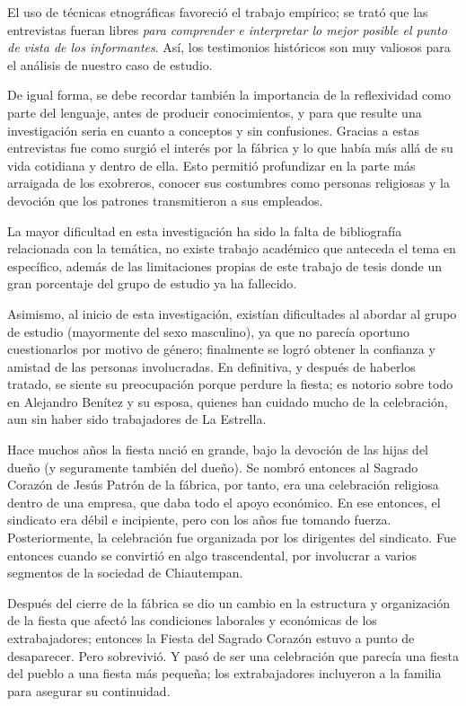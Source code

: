 \documentclass[14pt,letterpaper,twoside]{extbook} %
\begin{document}
El uso de técnicas etnográficas favoreció el trabajo empírico; se trató que las entrevistas fueran libres \textit{para comprender e interpretar lo mejor posible el punto de vista de los informantes}. Así, los testimonios históricos son muy valiosos para el análisis de nuestro caso de estudio.

De igual forma, se debe recordar también la importancia de la reflexividad como parte del lenguaje, antes de producir conocimientos, y para que resulte una investigación seria en cuanto a conceptos y sin confusiones. Gracias a estas entrevistas fue como surgió el interés por la fábrica y lo que había más allá de su vida cotidiana y dentro de ella. Esto permitió profundizar en la parte más arraigada de los exobreros, conocer sus costumbres como personas religiosas y la devoción que los patrones transmitieron a sus empleados.

La mayor dificultad en esta investigación ha sido la falta de bibliografía relacionada con la temática, no existe trabajo académico que anteceda el tema en específico, además de las limitaciones propias de este trabajo de tesis donde un gran porcentaje del grupo de estudio ya ha fallecido.

Asimismo, al inicio de esta investigación, existían dificultades al abordar al grupo de estudio (mayormente del sexo masculino), ya que no parecía oportuno cuestionarlos por motivo de género; finalmente se logró obtener la confianza y amistad de las personas involucradas. En definitiva, y después de haberlos tratado, se siente su preocupación porque perdure la fiesta; es notorio sobre todo en Alejandro Benítez y su esposa, quienes han cuidado mucho de la celebración, aun sin haber sido trabajadores de La Estrella.

Hace muchos años la fiesta nació en grande, bajo la devoción de las hijas del dueño (y seguramente también del dueño). Se nombró entonces al Sagrado Corazón de Jesús Patrón de la fábrica, por tanto, era una celebración religiosa dentro de una empresa, que daba todo el apoyo económico. En ese entonces, el sindicato era débil e incipiente, pero con los años fue tomando fuerza. Posteriormente, la celebración fue organizada por los dirigentes del sindicato. Fue entonces cuando se convirtió en algo trascendental, por involucrar a varios segmentos de la sociedad de Chiautempan.

Después del cierre de la fábrica se dio un cambio en la estructura y organización de la fiesta que afectó las condiciones laborales y económicas de los extrabajadores; entonces la Fiesta del Sagrado Corazón estuvo a punto de desaparecer. Pero sobrevivió. Y pasó de ser una celebración que parecía una fiesta del pueblo a una fiesta más pequeña; los extrabajadores incluyeron a la familia para asegurar su continuidad.
\end{document}
